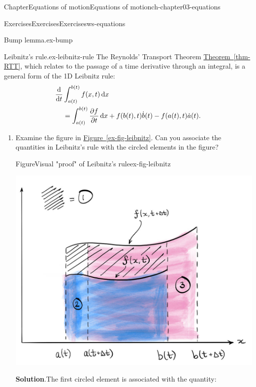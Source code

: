 \documentclass[oneside,10pt,]{book}
\newcommand{\blocktitlefont}{\relax}
\newcommand{\xreffont}{\relax}
\numberwithin{equation}{section}
\newcommand{\de}{\mathrm{d}}
\newcommand{\dd}[2]{\frac{\de#1}{\de#2}}
\newcommand{\pd}[2]{\frac{\partial#1}{\partial#2}}
\begin{document}
\begin{chapterptx}{Chapter}{Equations of motion}{}{Equations of motion}{}{}{ch-chapter03-equations}
\begin{exercises-section}{Exercises}{Exercises}{}{Exercises}{}{}{ws-equations}
\begin{divisionexercise}{2}{Bump lemma.}{}{ex-bump}
\end{divisionexercise}%
\begin{divisionexercise}{3}{Leibnitz's rule.}{}{ex-leibnitz-rule}%
The Reynolds' Transport Theorem \hyperref[thm-RTT]{Theorem~{\xreffont\ref{thm-RTT}}}, which relates to the passage of a time derivative through an integral, is a general form of the 1D Leibnitz rule:%
\begin{align}
\dd{}{t} & \int_{a(t)}^{b(t)} f(x, t) \, \de{x} \notag\\
& = \int_{a(t)}^{b(t)} \pd{f}{t} \, \de{x} + f(b(t), t) \dot{b}(t) - f(a(t), t)\dot{a}(t).\label{eqn-leibnitz-rule}
\end{align}
%
\begin{enumerate}[font=\bfseries,label=(\alph*),ref=\alph*]%
\item{}Examine the figure in \hyperref[ex-fig-leibnitz]{Figure~{\xreffont\ref{ex-fig-leibnitz}}}. Can you associate the quantities in Leibnitz's rule with the circled elements in the figure?%
\begin{figureptx}{Figure}{Visual "proof" of Leibnitz's rule}{ex-fig-leibnitz}{}%
\begin{image}{0.05}{0.9}{0.05}{}%
\includegraphics[width=\linewidth]{external/equations_leibnitz.jpg}
\end{image}%
\tcblower
\end{figureptx}%
\par\smallskip%
\noindent\textbf{\blocktitlefont Solution}.\hypertarget{ex-leibnitz-rule-3-2}{}\quad{}The first circled element is associated with the quantity:%
\begin{equation*}

\end{equation*}
\end{enumerate}
\end{divisionexercise}
\end{exercises-section}
\end{chapterptx}
\end{document}
